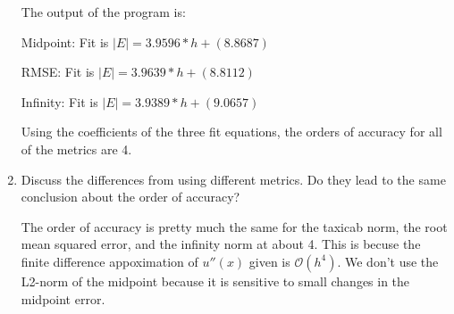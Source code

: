 \documentclass[12pt,letterpaper]{article}
\begin{document}
\begin{enumerate}
    The output of the program is:
\begin{center}
Midpoint: Fit is $|E| = 3.9596*h + (8.8687)$
\end{center}
\begin{center}
RMSE: Fit is $|E| = 3.9639*h + (8.8112)$
\end{center}
\begin{center}
Infinity: Fit is $|E| = 3.9389*h + (9.0657)$
\end{center}
    Using the coefficients of the three fit equations, the orders of accuracy for all of the metrics are 4.

	\item Discuss the differences from using different metrics. Do they lead to the same conclusion about the order of accuracy?
    
    The order of accuracy is pretty much the same for the taxicab norm, the root mean squared error, and the infinity norm at about 4. This is becuse the finite difference appoximation of $u''(x)$ given is $\mathcal{O}(h^4)$. We don't use the L2-norm of the midpoint because it is sensitive to small changes in the midpoint error. 
\end{enumerate}
\end{document}
